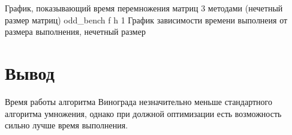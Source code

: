 График, показывающий время перемножения матриц 3 методами (нечетный размер матриц)\newline
{odd_bench} %
{f} %
{h} %
{1\textwidth} %
{График зависимости времени выполнеия от размера выполнения, нечетный размер} %

\section*{Вывод}

Время работы алгоритма Винограда незначительно меньше стандартного алгоритма умножения, однако при должной оптимизации есть возможность сильно лучше время выполнения.
